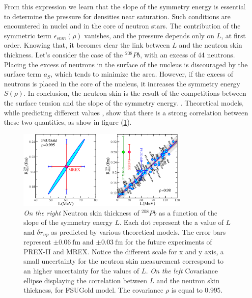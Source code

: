 From this expression we learn that the slope of the symmetry energy is essential to determine the pressure for densities near saturation. Such conditions are encountered in nuclei and in the core of neutron stars. The contribution of the symmetric term $\epsilon_{snm}(\rho)$ vanishes, and the pressure depends only on $L$, at first order. Knowing that, it becomes clear the link between $L$ and the neutron skin thickness. Let's consider the case of the $^{208}Pb$, with an excess of 44 neutrons. Placing the excess of neutrons in the surface of the nucleus is discouraged by the surface term $a_{S}$, which tends to minimize the area. However, if the excess of neutrons is placed in the core of the nucleus, it increases the symmetry energy $S(\rho)$. In conclusion, the neutron skin is the result of the competitions between the surface tension and the slope of the symmetry energy.
. Theoretical models, while predicting different values , show that there is a strong correlation between these two quantities, as show in figure (\ref{fig:LvsR}).


\begin{figure}[hbtp]
 \centering
 \includegraphics[width=0.75\textwidth]{Introduzione/LvsR.pdf}
 \caption{\textit{On the right} Neutron skin thickness of $^{208}Pb$ as a function of the slope of the symmetry energy $L$. Each dot represent the a value of $L$ and $\delta r_{np}$ as predicted by various theoretical models. The error bars represent $\pm \SI{0.06}{\femto \meter}$ and $\pm \SI{0.03}{\femto \meter}$ for the future experiments of PREX-II and MREX. Notice the different scale for x and y axis, a small uncertainty for the neutron skin measurement correspond to an higher uncertainty for the values of $L$. \textit{On the left} Covariance ellipse displaying the correlation between $L$ and the neutron skin thickness, for FSUGold model. The covariance $\rho$ is equal to 0.995.}
\label{fig:LvsR}
\end{figure}


